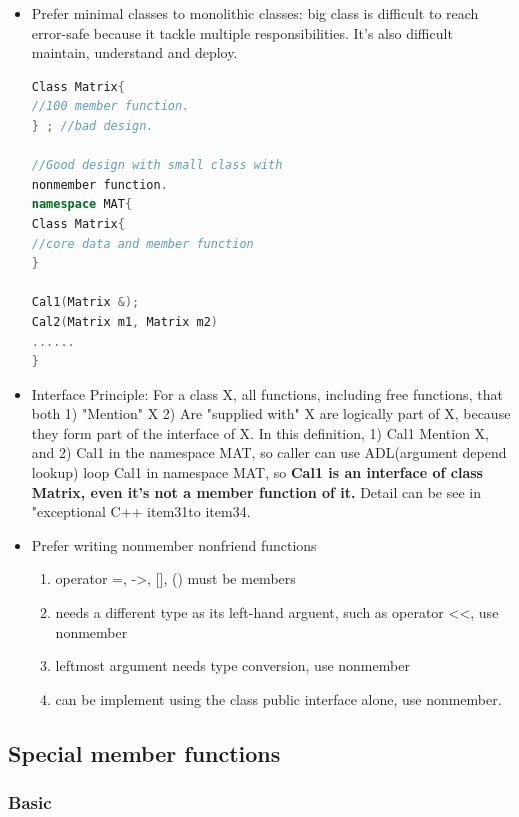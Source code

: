 \documentclass[a4paper,12pt,twoside]{book}
\begin{document}
\begin{itemize}
\item Prefer minimal classes to monolithic classes: big class is difficult to reach error-safe because it tackle multiple responsibilities. It's also difficult maintain, understand and deploy.
\begin{lstlisting}[frame=single, language=c++]
Class Matrix{
//100 member function.
} ; //bad design.

//Good design with small class with
nonmember function.
namespace MAT{
Class Matrix{
//core data and member function
}

Cal1(Matrix &);
Cal2(Matrix m1, Matrix m2)
......
}
\end{lstlisting}

\item Interface Principle: For a class X, all functions, including free functions, that both
1) "Mention" X 2) Are "supplied with" X  are logically part of X, because they form part of the interface of X.  In this definition, 1) Cal1 Mention X,  and 2) Cal1 in the namespace MAT, so caller can use ADL(argument depend lookup) loop Cal1 in namespace MAT, so \textbf{Cal1 is an interface of class Matrix, even it's not a member function of it.} Detail can be see in "exceptional C++ item31to item34.

\item Prefer writing nonmember nonfriend functions
\begin{enumerate}
\item operator =, ->, [], () must be members
\item needs a different type as its left-hand arguent, such as operator <<, use nonmember
\item leftmost argument needs type conversion, use nonmember
\item can be implement using the class public interface alone, use nonmember.
\end{enumerate}

\end{itemize}

\subsection{Special member functions}

\subsubsection{Basic}
\end{document}

